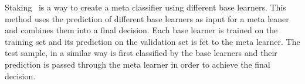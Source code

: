 Staking~\cite{wolpert1992stacked} is a way to create a meta classifier using different base learners.
This method uses the prediction of different base learners as input for a meta leaner and combines them into a final decision.
Each base learner is trained on the training set and its prediction on the validation set is fet to the meta learner.
The test sample, in a similar way is first classified by the base learners and their prediction is passed through the meta learner in order to achieve the final decision.

 
